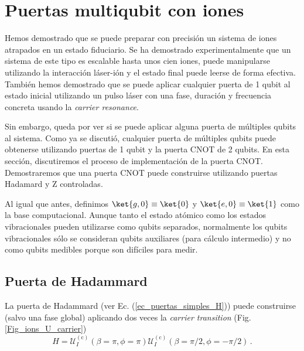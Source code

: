 \section{Puertas multiqubit con iones} \label{sec_ions_multiqubit}

Hemos demostrado que se puede preparar con precisión un sistema de iones atrapados en un estado fiduciario. Se ha demostrado experimentalmente que un sistema de este tipo es escalable hasta unos cien iones, puede manipularse utilizando la interacción láser-ión y el estado final puede leerse de forma efectiva. También hemos demostrado que se puede aplicar cualquier puerta de 1 qubit al estado inicial utilizando un pulso láser con una fase, duración y frecuencia concreta usando la \textit{carrier resonance}. 

Sin embargo, queda por ver si se puede aplicar alguna puerta de múltiples qubits al sistema. Como ya se discutió, cualquier puerta de múltiples qubits puede obtenerse utilizando puertas de 1 qubit y la puerta CNOT de 2 qubits. En esta sección, discutiremos el proceso de implementación de la puerta CNOT. Demostraremos que una puerta CNOT puede construirse utilizando puertas Hadamard y Z controladas.

Al igual que antes, definimos $\ket{g,0} \equiv \ket{0}$ y $\ket{e,0} \equiv \ket{1}$ como la base computacional.  Aunque tanto el estado atómico como los estados vibracionales pueden utilizarse como qubits separados, normalmente los qubits vibracionales sólo se consideran qubits auxiliares (para cálculo intermedio) y no como qubits medibles porque son difíciles para medir.

\subsection{Puerta de Hadammard}

La puerta de Hadammard (ver Ec. (\ref{ec_puertas_simples_H})) puede construirse (salvo una fase global) aplicando dos veces la \textit{carrier transition} (Fig. \ref{Fig_ions_U_carrier})
	\begin{equation}  \label{ec_ions_H}
	H = \mathcal{U}_I^{(\text{c})}(\beta = \pi, \phi = \pi) \mathcal{U}_I^{(\text{c})}(\beta = \pi/2, \phi = -\pi/2) \, .
	\end{equation}

